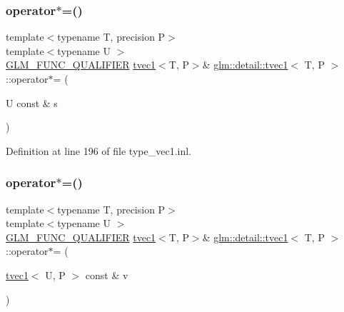 \mbox{\label{structglm_1_1detail_1_1tvec1_a38c64ab613b91222e34ffd8f8a97af7a}} 
\subsubsection{\texorpdfstring{operator$\ast$=()}{operator*=()}\hspace{0.1cm}{\footnotesize\ttfamily [3/4]}}
{\footnotesize\ttfamily template$<$typename T, precision P$>$ \\
template$<$typename U $>$ \\
\hyperlink{setup_8hpp_a33fdea6f91c5f834105f7415e2a64407}{G\+L\+M\+\_\+\+F\+U\+N\+C\+\_\+\+Q\+U\+A\+L\+I\+F\+I\+ER} \hyperlink{structglm_1_1detail_1_1tvec1}{tvec1}$<$T, P$>$\& \hyperlink{structglm_1_1detail_1_1tvec1}{glm\+::detail\+::tvec1}$<$ T, P $>$\+::operator$\ast$= (\begin{DoxyParamCaption}\item[{U const \&}]{s }\end{DoxyParamCaption})}



Definition at line 196 of file type\+\_\+vec1.\+inl.

\mbox{\label{structglm_1_1detail_1_1tvec1_ab5aa275a687a56ff82469c9c9334f145}} 
\subsubsection{\texorpdfstring{operator$\ast$=()}{operator*=()}\hspace{0.1cm}{\footnotesize\ttfamily [4/4]}}
{\footnotesize\ttfamily template$<$typename T, precision P$>$ \\
template$<$typename U $>$ \\
\hyperlink{setup_8hpp_a33fdea6f91c5f834105f7415e2a64407}{G\+L\+M\+\_\+\+F\+U\+N\+C\+\_\+\+Q\+U\+A\+L\+I\+F\+I\+ER} \hyperlink{structglm_1_1detail_1_1tvec1}{tvec1}$<$T, P$>$\& \hyperlink{structglm_1_1detail_1_1tvec1}{glm\+::detail\+::tvec1}$<$ T, P $>$\+::operator$\ast$= (\begin{DoxyParamCaption}\item[{\hyperlink{structglm_1_1detail_1_1tvec1}{tvec1}$<$ U, P $>$ const \&}]{v }\end{DoxyParamCaption})}




